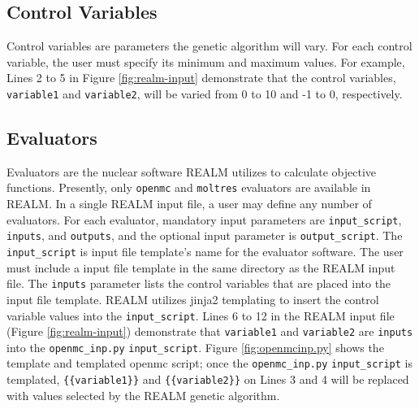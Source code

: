 \subsection{Control Variables}
Control variables are parameters the genetic algorithm will vary. 
For each control variable, the user must specify its minimum and maximum values.
For example, Lines 2 to 5 in Figure \ref{fig:realm-input} demonstrate that the 
control variables, \texttt{variable1} and \texttt{variable2}, 
will be varied from 0 to 10 and -1 to 0, respectively. 

\subsection{Evaluators}
Evaluators are the nuclear software \gls{REALM} utilizes to calculate objective functions. 
Presently, only \texttt{openmc} and \texttt{moltres} evaluators are available 
in \gls{REALM}.
In a single \gls{REALM} input file, a user may define any number of evaluators. 
For each evaluator, mandatory input parameters are \texttt{input\_script}, 
\texttt{inputs}, and \texttt{outputs}, and the optional input parameter is
\texttt{output\_script}. 
The \texttt{input\_script} is input file template's name for the evaluator software. 
The user must include a input file template in the same directory as the \gls{REALM} input 
file. 
The \texttt{inputs} parameter lists the control variables that are placed into the 
input file template. 
REALM utilizes jinja2 templating to insert the control variable values into the 
\texttt{input\_script}. 
Lines 6 to 12 in the \gls{REALM} input file (Figure \ref{fig:realm-input}) demonstrate 
that \texttt{variable1} and \texttt{variable2} are \texttt{inputs} into the 
\texttt{openmc\_inp.py} \texttt{input\_script}. 
Figure \ref{fig:openmcinp.py} shows the template and templated openmc script; 
once the \texttt{openmc\_inp.py} \texttt{input\_script} is templated, 
\texttt{\{\{variable1\}\}} and \texttt{\{\{variable2\}\}}  on Lines 3 and 4 will be 
replaced with values selected by the \gls{REALM} genetic algorithm. 
